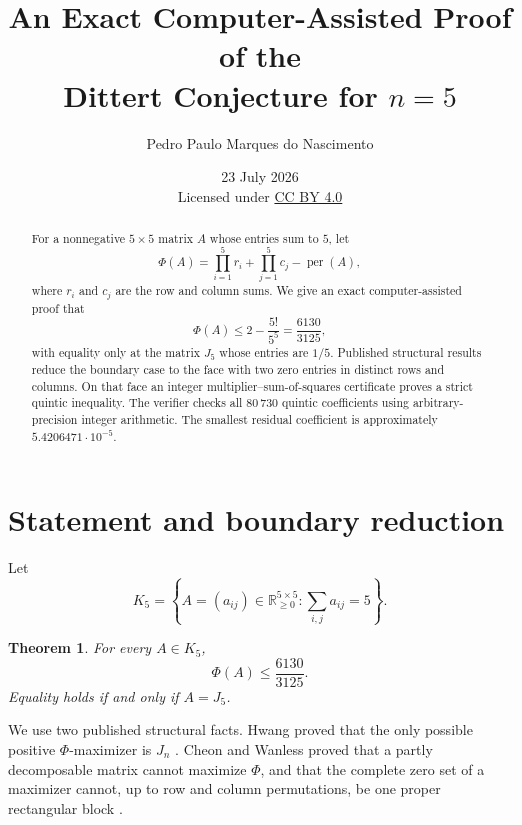\documentclass[11pt]{article}
\title{An Exact Computer-Assisted Proof of the\\Dittert Conjecture for $n=5$}
\author{Pedro Paulo Marques do Nascimento}
\date{23 July 2026\\[0.4em]
\small Licensed under \href{https://creativecommons.org/licenses/by/4.0/}{CC BY 4.0}}
\newtheorem{theorem}{Theorem}
\newcommand{\permanent}{\operatorname{per}}
\newcommand{\R}{\mathbb{R}}
\begin{document}
\maketitle

\begin{center}
\end{center}

\begin{abstract}
For a nonnegative $5\times5$ matrix $A$ whose entries sum to $5$, let
\[
 \Phi(A)=\prod_{i=1}^{5}r_i+\prod_{j=1}^{5}c_j-\permanent(A),
\]
where $r_i$ and $c_j$ are the row and column sums.  We give an exact
computer-assisted proof that
\[
 \Phi(A)\le 2-\frac{5!}{5^5}=\frac{6130}{3125},
\]
with equality only at the matrix $J_5$ whose entries are $1/5$.  Published
structural results reduce the boundary case to the face with two zero entries
in distinct rows and columns.  On that face an integer
multiplier--sum-of-squares certificate proves a strict quintic inequality.
The verifier checks all $80\,730$ quintic coefficients using arbitrary-precision
integer arithmetic.  The smallest residual coefficient is approximately
$5.4206471\cdot10^{-5}$.
\end{abstract}

\section{Statement and boundary reduction}
Let
\[
 K_5=\left\{A=(a_{ij})\in\R_{\ge0}^{5\times5}:
             \sum_{i,j}a_{ij}=5\right\}.
\]

\begin{theorem}\label{thm:main}
For every $A\in K_5$,
\[
 \Phi(A)\le\frac{6130}{3125}.
\]
Equality holds if and only if $A=J_5$.
\end{theorem}

We use two published structural facts.  Hwang proved that the only possible
positive $\Phi$-maximizer is $J_n$ \cite{Hwang1986}.  Cheon and Wanless proved
that a partly decomposable matrix cannot maximize $\Phi$, and that the
complete zero set of a maximizer cannot, up to row and column permutations,
be one proper rectangular block \cite[Theorems~3.2 and~3.7]{CheonWanless2012}.
\end{document}
